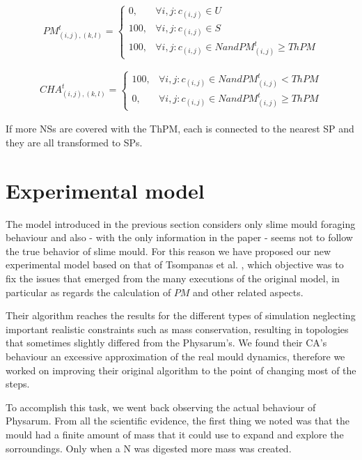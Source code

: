 \begin{equation}
PM^t_{(i, j),(k,l)}=
\begin{cases} 
0, & \forall i, j: c_{(i,j)} \in U \\ 
100, & \forall i, j: c_{(i,j)} \in S \\ 
100, & \forall i, j: c_{(i,j)} \in N and  PM^t_{(i, j)} \geq ThPM 
\end{cases}
\end{equation}

\begin{align}
CHA^t_{(i, j),(k,l)}=
\begin{cases} 
100, & \forall i, j: c_{(i,j)} \in N and PM^t_{(i, j)} < ThPM\\ 
0, & \forall i, j: c_{(i,j)} \in N and  PM^t_{(i, j)} \geq ThPM 
\end{cases}
\end{align}

If more NSs are covered with the ThPM, each is connected to the nearest SP and they are all transformed to SPs. 

\section{Experimental model}

The model introduced in the previous section considers only slime mould foraging behaviour and also - with the only information in the paper - seems not to follow the true behavior of slime mould. For this reason we have proposed our new experimental model based on that of Tsompanas et al. \cite{Tsompanas2016}, which objective was to fix the issues that emerged from the many executions of the original model, in particular as regards the calculation of $PM$ and other related aspects.

\par
Their algorithm reaches the results for the different types of simulation neglecting important realistic constraints such as mass conservation, resulting in topologies that sometimes slightly differed from the Physarum's. We found their CA's behaviour an excessive approximation of the real mould dynamics, therefore we worked on improving their original algorithm to the point of changing most of the steps.

\par
To accomplish this task, we went back observing the actual behaviour of Physarum. From all the scientific evidence, the first thing we noted was that the mould had a finite amount of mass that it could use to expand and explore the sorroundings. Only when a N was digested more mass was created. 

